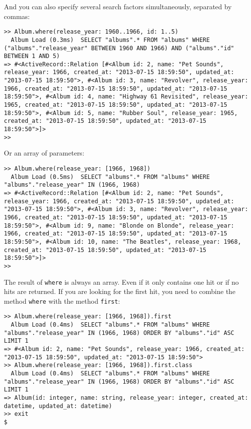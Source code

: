 \documentclass[a4paper]{book}
\begin{document}
And you can also specify several search factors simultaneously, separated by commas:

\begin{shaded}\begin{verbatim}
>> Album.where(release_year: 1960..1966, id: 1..5)
  Album Load (0.3ms)  SELECT "albums".* FROM "albums" WHERE ("albums"."release_year" BETWEEN 1960 AND 1966) AND ("albums"."id" BETWEEN 1 AND 5)
=> #<ActiveRecord::Relation [#<Album id: 2, name: "Pet Sounds", release_year: 1966, created_at: "2013-07-15 18:59:50", updated_at: "2013-07-15 18:59:50">, #<Album id: 3, name: "Revolver", release_year: 1966, created_at: "2013-07-15 18:59:50", updated_at: "2013-07-15 18:59:50">, #<Album id: 4, name: "Highway 61 Revisited", release_year: 1965, created_at: "2013-07-15 18:59:50", updated_at: "2013-07-15 18:59:50">, #<Album id: 5, name: "Rubber Soul", release_year: 1965, created_at: "2013-07-15 18:59:50", updated_at: "2013-07-15 18:59:50">]>
>>
\end{verbatim}\end{shaded}

Or an array of parameters:

\begin{shaded}\begin{verbatim}
>> Album.where(release_year: [1966, 1968])
  Album Load (0.5ms)  SELECT "albums".* FROM "albums" WHERE "albums"."release_year" IN (1966, 1968)
=> #<ActiveRecord::Relation [#<Album id: 2, name: "Pet Sounds", release_year: 1966, created_at: "2013-07-15 18:59:50", updated_at: "2013-07-15 18:59:50">, #<Album id: 3, name: "Revolver", release_year: 1966, created_at: "2013-07-15 18:59:50", updated_at: "2013-07-15 18:59:50">, #<Album id: 9, name: "Blonde on Blonde", release_year: 1966, created_at: "2013-07-15 18:59:50", updated_at: "2013-07-15 18:59:50">, #<Album id: 10, name: "The Beatles", release_year: 1968, created_at: "2013-07-15 18:59:50", updated_at: "2013-07-15 18:59:50">]>
>>
\end{verbatim}\end{shaded}

The result of \texttt{where} is always an array. Even if it only contains one hit or if no hits are returned. If you are looking for the first hit, you need to combine the method \texttt{where} with the method \texttt{first}:

\begin{shaded}\begin{verbatim}
>> Album.where(release_year: [1966, 1968]).first
  Album Load (0.4ms)  SELECT "albums".* FROM "albums" WHERE "albums"."release_year" IN (1966, 1968) ORDER BY "albums"."id" ASC LIMIT 1
=> #<Album id: 2, name: "Pet Sounds", release_year: 1966, created_at: "2013-07-15 18:59:50", updated_at: "2013-07-15 18:59:50">
>> Album.where(release_year: [1966, 1968]).first.class
  Album Load (0.4ms)  SELECT "albums".* FROM "albums" WHERE "albums"."release_year" IN (1966, 1968) ORDER BY "albums"."id" ASC LIMIT 1
=> Album(id: integer, name: string, release_year: integer, created_at: datetime, updated_at: datetime)
>> exit
$
\end{verbatim}\end{shaded}
\end{document}
